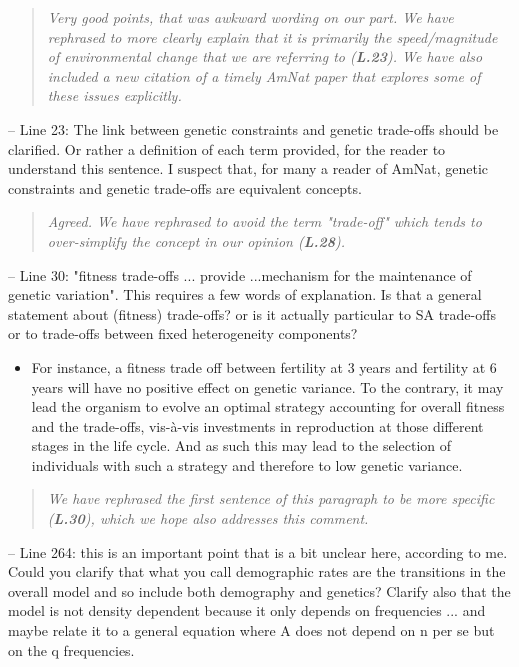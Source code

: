 \documentclass[11pt]{article}
\begin{document}
\begin{quote}
	{\itshape Very good points, that was awkward wording on our part. We have rephrased to more clearly explain that it is primarily the speed/magnitude of environmental change that we are referring to ({\bf L.23}). We have also included a new citation of a timely AmNat paper that explores some of these issues explicitly.}
\end{quote}


\noindent -- Line 23: The link between genetic constraints and genetic trade-offs should be clarified. Or rather a definition of each term provided, for the reader to understand this sentence. I suspect that, for many a reader of AmNat, genetic constraints and genetic trade-offs are equivalent concepts.

\begin{quote}
	{\itshape Agreed. We have rephrased to avoid the term "trade-off" which tends to over-simplify the concept in our opinion ({\bf L.28}).}
\end{quote}

\noindent -- Line 30: "fitness trade-offs ... provide ...mechanism for the maintenance of genetic variation". This requires a few words of explanation. Is that a general statement about (fitness) trade-offs? or is it actually particular to SA trade-offs or to trade-offs between fixed heterogeneity components?
\begin{itemize}
	\item For instance, a fitness trade off between fertility at 3 years and fertility at 6 years will have no positive effect on genetic variance. To the contrary, it may lead the organism to evolve an optimal strategy accounting for overall fitness and the trade-offs, vis-à-vis investments in reproduction at those different stages in the life cycle. And as such this may lead to the selection of individuals with such a strategy and therefore to low genetic variance.
\end{itemize}

\begin{quote}
	{\itshape We have rephrased the first sentence of this paragraph to be more specific ({\bf L.30}), which we hope also addresses this comment.}
\end{quote}


\noindent -- Line 264: this is an important point that is a bit unclear here, according to me. Could you clarify that what you call demographic rates are the transitions in the overall model and so include both demography and genetics? Clarify also that the model is not density dependent because it only depends on frequencies ... and maybe relate it to a general equation where A does not depend on n per se but on the q frequencies.
\end{document}
